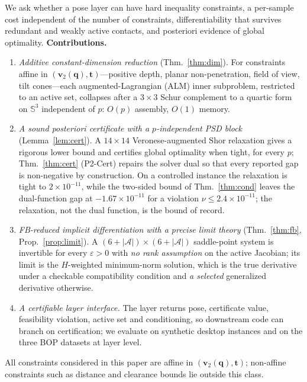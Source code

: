 We ask whether a pose layer can have hard inequality constraints, a per-sample cost independent of the number of constraints, differentiability that survives redundant and weakly active contacts, and posteriori evidence of global optimality. \textbf{Contributions.}
\begin{enumerate}
\item \emph{Additive constant-dimension reduction} (Thm.~\ref{thm:dim}). For constraints affine in $(\mathbf v_2(\mathbf q),\mathbf t)$---positive depth, planar non-penetration, field of view, tilt cones---each augmented-Lagrangian (ALM) inner subproblem, restricted to an active set, collapses after a $3\times3$ Schur complement to a quartic form on $\mathbb{S}^3$ independent of $p$: $O(p)$ assembly, $O(1)$ memory.
\item \emph{A sound posteriori certificate with a $p$-independent PSD block} (Lemma~\ref{lem:cert}). A $14\times14$ Veronese-augmented Shor relaxation gives a rigorous lower bound and certifies global optimality when tight, for every $p$; Thm.~\ref{thm:cert} (P2-Cert) repairs the solver dual so that every reported gap is non-negative by construction. On a controlled instance the relaxation is tight to $2\times10^{-11}$, while the two-sided bound of Thm.~\ref{thm:cond} leaves the dual-function gap at $-1.67\times10^{-11}$ for a violation $\nu\le2.4\times10^{-11}$; the relaxation, not the dual function, is the bound of record.
\item \emph{FB-reduced implicit differentiation with a precise limit theory} (Thm.~\ref{thm:fb}, Prop.~\ref{prop:limit}). A $(6+|\mathcal A|)\times(6+|\mathcal A|)$ saddle-point system is invertible for every $\varepsilon>0$ with \emph{no rank assumption} on the active Jacobian; its limit is the $H$-weighted minimum-norm solution, which is the true derivative under a checkable compatibility condition and \emph{a selected} generalized derivative otherwise.
\item \emph{A certifiable layer interface.} The layer returns pose, certificate value, feasibility violation, active set and conditioning, so downstream code can branch on certification; we evaluate on synthetic desktop instances and on the three BOP datasets at layer level.
\end{enumerate}
All constraints considered in this paper are affine in $(\mathbf v_2(\mathbf q),\mathbf t)$; non-affine constraints such as distance and clearance bounds lie outside this class.
